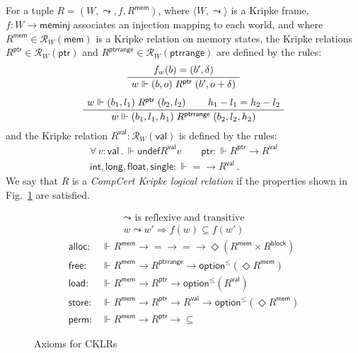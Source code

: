 \documentclass[sigplan,10pt,review,anonymous]{acmart}
\newcommand{\kw}[1]{\ensuremath{ \mathsf{#1} }}
\begin{document}
\begin{definition} \label{def:cklr} %
For a tuple $R = (W, \leadsto, f, R^\kw{mem})$,
where
$\langle W, \leadsto \rangle$ is a Kripke frame,
$f : W \rightarrow \kw{meminj}$
associates an injection mapping to each world, and where
$R^\kw{mem} \in \mathcal{R}_{W}(\kw{mem})$
is a Kripke relation on memory states,
the Kripke relations
$R^\kw{ptr} \in \mathcal{R}_W(\kw{ptr})$ and
$R^\kw{ptrrange} \in \mathcal{R}_W(\kw{ptrrange})$
are defined by the rules:
\begin{gather*}
  \AxiomC{$f_w(b) = (b', \delta)$}
  \UnaryInfC{$w \Vdash (b, o) \mathrel{R^\kw{ptr}} (b', o + \delta)$}
  \DisplayProof
  \\[1ex]
  \AxiomC{$w \Vdash (b_1, l_1) \mathrel{R^\kw{ptr}} (b_2, l_2)$}
  \AxiomC{$h_1 - l_1 = h_2 - l_2$}
  \BinaryInfC{$w \Vdash (b_1, l_1, h_1) \mathrel{R^\kw{ptrrange}} (b_2, l_2, h_2)$}
  \DisplayProof
\end{gather*}
and the Kripke relation
$R^\kw{val} : \mathcal{R}_W(\kw{val})$
is defined by the rules:
\begin{gather*}
  \forall \, v : \kw{val} \,.\,
    \Vdash \kw{undef} \mathrel{R^\kw{val}} v \qquad
  \kw{ptr} : {\Vdash R^\kw{ptr} \rightarrow R^\kw{val}} \\
  \kw{int}, \kw{long}, \kw{float}, \kw{single} :
    {\Vdash {=} \rightarrow R^\kw{val}} \,.
\end{gather*}
We say that $R$ is a \emph{CompCert Kripke logical relation}
if the properties shown in Fig.~\ref{fig:cklr-def} are satisfied.
\end{definition}

\begin{figure} %
  \begin{gather*}
    {\leadsto} \mbox{ is reflexive and transitive} \\
    w \leadsto w' \Rightarrow f(w) \subseteq f(w')
  \end{gather*}
  \begin{align*}
      \kw{alloc} :
        &\Vdash R^\kw{mem} \rightarrow {=} \rightarrow {=} \rightarrow
        \Diamond (R^\kw{mem} \times R^\kw{block})
      \\
      \kw{free} :
        &\Vdash R^\kw{mem} \rightarrow R^\kw{ptrrange} \rightarrow
        \kw{option}^\le(\Diamond R^\kw{mem})
      \\
      \kw{load} :
        &\Vdash R^\kw{mem} \rightarrow R^\kw{ptr} \rightarrow
        \kw{option}^\le(R^\kw{val})
      \\
      \kw{store} :
        &\Vdash R^\kw{mem} \rightarrow R^\kw{ptr} \rightarrow R^\kw{val} \rightarrow
        \kw{option}^\le(\Diamond R^\kw{mem})
      \\
      \kw{perm} :
        &\Vdash R^\kw{mem} \rightarrow R^\kw{ptr} \rightarrow {\subseteq}
  \end{align*}
  \caption{Axioms for CKLRs}
  \label{fig:cklr-def}
\end{figure}
\end{document}
